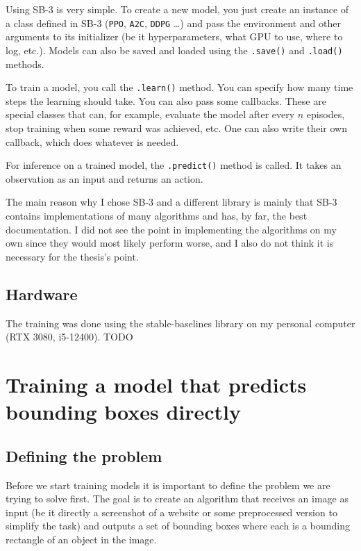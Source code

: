 \documentclass[
  digital,     %
  oneside,     %
  nosansbold,  %
  nocolorbold, %
  lof,         %
  lot,         %
]{fithesis4}
\begin{document}
Using SB-3 is very simple. To create a new model, you just create an instance of a class defined in SB-3 (\texttt{PPO}, \texttt{A2C}, \texttt{DDPG} \ldots ) and pass the environment and other arguments to its initializer (be it hyperparameters, what GPU to use, where to log, etc.). Models can also be saved and loaded using the \texttt{.save()} and \texttt{.load()} methods.

To train a model, you call the \texttt{.learn()} method. You can specify how many time steps the learning should take. You can also pass some callbacks. These are special classes that can, for example, evaluate the model after every $n$ episodes, stop training when some reward was achieved, etc. One can also write their own callback, which does whatever is needed.

For inference on a trained model, the \texttt{.predict()} method is called. It takes an observation as an input and returns an action.

The main reason why I chose SB-3 and a different library is mainly that SB-3 contains implementations of many algorithms and has, by far, the best documentation. I did not see the point in implementing the algorithms on my own since they would most likely perform worse, and I also do not think it is necessary for the thesis's point.

\section{Hardware}
The training was done using the stable-baselines library on my personal computer (RTX 3080, i5-12400). TODO

\chapter{Training a model that predicts bounding boxes directly}

\section{Defining the problem}

Before we start training models it is important to define the problem we are trying to solve first. The goal is to create an algorithm that receives an image as input (be it directly a screenshot of a website or some preprocessed version to simplify the task) and outputs a set of bounding boxes where each is a bounding rectangle of an object in the image.
\end{document}
